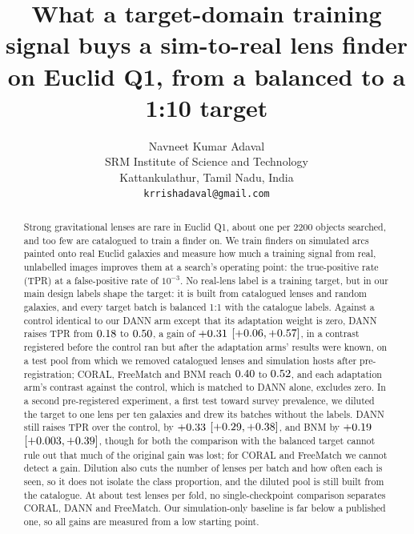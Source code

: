 \documentclass[11pt,a4paper]{article}
\title{What a target-domain training signal buys a sim-to-real lens finder on Euclid Q1,
       from a balanced to a 1:10 target}
\author{Navneet Kumar Adaval\\
  SRM Institute of Science and Technology\\
  Kattankulathur, Tamil Nadu, India\\
  \texttt{krrishadaval@gmail.com}}
\date{}
\begin{document}
\maketitle

\begin{abstract}
Strong gravitational lenses are rare in Euclid Q1, about one per 2200 objects searched, and too few
are catalogued to train a finder on. We train finders on simulated arcs painted onto real
Euclid galaxies and measure how much a training signal from real, unlabelled images improves
them at a search's operating point: the true-positive rate (TPR) at a false-positive
rate of $10^{-3}$. No real-lens label is a training target, but in our main design labels shape
the target: it is built from catalogued lenses and random galaxies, and every target batch is
balanced 1:1 with the catalogue labels. Against a control identical to our DANN arm except that
its adaptation weight is zero, DANN raises TPR from $0.18{}$ to $0.50{}$, a
gain of $+0.31{}$ $[+0.06{}, +0.57{}]$, in a contrast registered before the
control ran but after the adaptation arms' results were known, on a test pool from
which we removed catalogued lenses and simulation hosts after pre-registration; CORAL, FreeMatch and BNM reach
$0.40{}$ to $0.52{}$, and each adaptation arm's contrast against the control, which is matched to DANN alone,
excludes zero. In a second
pre-registered experiment, a first test toward survey prevalence, we diluted the target to one
lens per ten galaxies and drew its batches without the labels. DANN still raises TPR over the
control, by $+0.33{}$ $[+0.29{}, +0.38{}]$, and BNM by $+0.19{}$
$[+0.003{}, +0.39{}]$, though for both the comparison with the balanced target
cannot rule out that much of the original gain was lost; for CORAL and FreeMatch we cannot detect a gain.
Dilution also cuts the number of lenses per batch and how often each is seen, so it does not
isolate the class proportion, and the diluted pool is still built from the catalogue. At about
\rwFivePosPerFold{} test lenses per fold, no single-checkpoint comparison separates CORAL, DANN
and FreeMatch. Our simulation-only baseline is far below a published one, so all gains are
measured from a low starting point.
\end{abstract}










\end{document}
